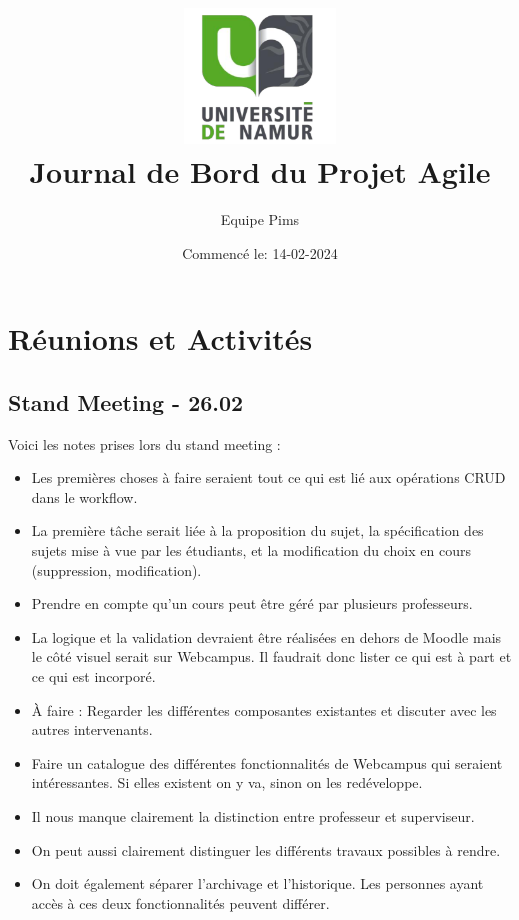 \documentclass[11pt]{article}
\title{\includegraphics[width=4cm]{images/logo_unamur.png}\\[1cm] %
Journal de Bord du Projet Agile}
\author{Equipe Pims}
\date{Commencé le: 14-02-2024}
\begin{document}
\maketitle



\maketitle

\newpage
\section*{Réunions et Activités}




\subsection*{{\color{navy}Stand Meeting - 26.02}}
Voici les notes prises lors du stand meeting :

\begin{itemize}
    \item Les premières choses à faire seraient tout ce qui est lié aux opérations CRUD dans le workflow.
    \item La première tâche serait liée à la proposition du sujet, la spécification des sujets mise à vue par les étudiants, et la modification du choix en cours (suppression, modification).
    \item Prendre en compte qu’un cours peut être géré par plusieurs professeurs.
    \item La logique et la validation devraient être réalisées en dehors de Moodle mais le côté visuel serait sur Webcampus. Il faudrait donc lister ce qui est à part et ce qui est incorporé.
    \item À faire : Regarder les différentes composantes existantes et discuter avec les autres intervenants.
    \item Faire un catalogue des différentes fonctionnalités de Webcampus qui seraient intéressantes. Si elles existent on y va, sinon on les redéveloppe.
    \item Il nous manque clairement la distinction entre professeur et superviseur.
    \item On peut aussi clairement distinguer les différents travaux possibles à rendre.
    \item On doit également séparer l’archivage et l’historique. Les personnes ayant accès à ces deux fonctionnalités peuvent différer.
\end{itemize}
\end{document}

